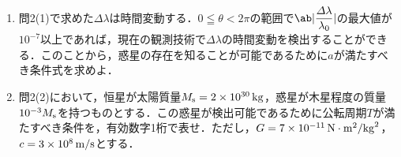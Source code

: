 \begin{enumerate}[label=\textbf{問\arabic*}]
\begin{enumerate}[(1)]
      \item {\hzw}問2(1)で求めた$\varDelta \lambda$は時間変動する．$0 \leqq \theta < 2\pi$の範囲で$\ab|\dfrac{\varDelta \lambda}{\lambda_0}|$の最大値が$10^{-7}$以上であれば，現在の観測技術で$\varDelta \lambda$の時間変動を検出することができる．このことから，惑星の存在を知ることが可能であるために$a$が満たすべき条件式を求めよ．
      \item {\hzw}問2(2)において，恒星が太陽質量$M_\mathrm{s} = 2 \times 10^{30} \, \mathrm{kg}$，惑星が木星程度の質量$10^{-3}M_\mathrm{s}$を持つものとする．この惑星が検出可能であるために公転周期$T$が満たすべき条件を，有効数字1桁で表せ．ただし，$G = 7 \times 10^{-11}\,\mathrm{N}\cdot\mathrm{m}^2/\mathrm{kg}^2$，$c = 3 \times 10^{8} \, \mathrm{m/s}$とする．
    \end{enumerate}

\end{enumerate}
